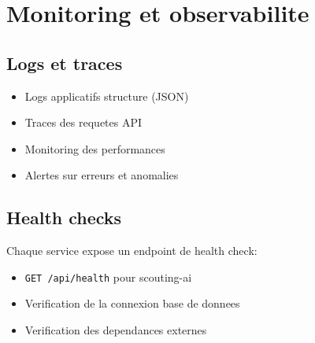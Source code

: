 \section{Monitoring et observabilite}

\subsection*{Logs et traces}

\begin{itemize}[leftmargin=*]
  \item Logs applicatifs structure (JSON)
  \item Traces des requetes API
  \item Monitoring des performances
  \item Alertes sur erreurs et anomalies
\end{itemize}

\subsection*{Health checks}

Chaque service expose un endpoint de health check:

\begin{itemize}[leftmargin=*]
  \texttt{GET /health} pour football-academy
  \item \texttt{GET /api/health} pour scouting-ai
  \item Verification de la connexion base de donnees
  \item Verification des dependances externes
\end{itemize}